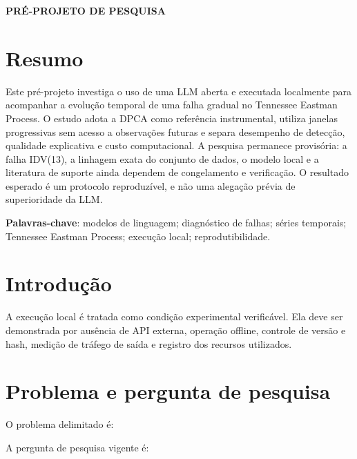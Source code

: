 \documentclass[a4paper,12pt]{abntex2}
\begin{document}
\begin{titlingpage}\centering
{\bfseries\Large PRÉ-PROJETO DE PESQUISA\par}\vspace{3cm}
{\Large \ResearchTitlePT\par}\vfill
\researchauthor\par\researchinstitution\par\researchyear
\end{titlingpage}
\tableofcontents\newpage

\section{Resumo}
Este pré-projeto investiga o uso de uma LLM aberta e executada localmente para acompanhar a evolução temporal de uma falha gradual no Tennessee Eastman Process. O estudo adota a DPCA como referência instrumental, utiliza janelas progressivas sem acesso a observações futuras e separa desempenho de detecção, qualidade explicativa e custo computacional. A pesquisa permanece provisória: a falha IDV(13), a linhagem exata do conjunto de dados, o modelo local e a literatura de suporte ainda dependem de congelamento e verificação. O resultado esperado é um protocolo reproduzível, e não uma alegação prévia de superioridade da LLM.

\textbf{Palavras-chave}: modelos de linguagem; diagnóstico de falhas; séries temporais; Tennessee Eastman Process; execução local; reprodutibilidade.

\section{Introdução}
\ResearchProblemPT

A execução local é tratada como condição experimental verificável. Ela deve ser demonstrada por ausência de API externa, operação offline, controle de versão e hash, medição de tráfego de saída e registro dos recursos utilizados. \ResearchLimitationsPT

\section{Problema e pergunta de pesquisa}
O problema delimitado é: \ResearchProblemPT

A pergunta de pesquisa vigente é:

\begin{quote}
\ResearchQuestionPT
\end{quote}
\end{document}
